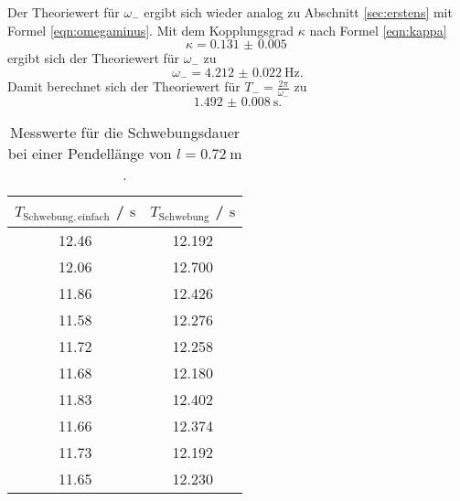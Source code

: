 Der Theoriewert für $\omega_-$ ergibt sich wieder analog zu Abschnitt \ref{sec:erstens} mit
Formel \eqref{eqn:omegaminus}. Mit dem Kopplungsgrad $\kappa$ nach Formel \eqref{eqn:kappa}
\begin{equation*}
	\kappa = \SI{0.131(5)}{}
\end{equation*}
ergibt sich der Theoriewert für $\omega_-$ zu
\begin{equation*}
	\omega_- = \SI{4.212(22)}{\hertz} \mathrm{.}
\end{equation*}
Damit berechnet sich der Theoriewert für $T_- = \frac{2\pi}{\omega_-}$ zu
\begin{equation*}
	\SI{1.492(8)}{\second} \mathrm{.}
\end{equation*}


\begin{table}
	\centering
	\caption{Messwerte für die Schwebungsdauer bei einer Pendellänge von $l=\SI{0.72}{\meter}$.}
	\label{tab:kalou}
	\begin{tabular}{cc}
		\toprule
		$T_{\mathrm{Schwebung,einfach}}$ / $\si{\second}$ & $T_{\mathrm{Schwebung}}$ / $\si{\second}$ \\
		\midrule
		12.46                                             & 12.192                                    \\
		12.06                                             & 12.700                                    \\
		11.86                                             & 12.426                                    \\
		11.58                                             & 12.276                                    \\
		11.72                                             & 12.258                                    \\
		11.68                                             & 12.180                                    \\
		11.83                                             & 12.402                                    \\
		11.66                                             & 12.374                                    \\
		11.73                                             & 12.192                                    \\
		11.65                                             & 12.230                                    \\
		\bottomrule
	\end{tabular}
\end{table}

